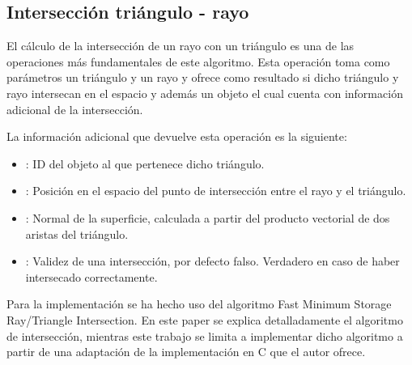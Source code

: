 \subsection{Intersección triángulo - rayo}
\label{subsec:triintersection}
	
El cálculo de la intersección de un rayo con un triángulo es una de las operaciones más fundamentales de este algoritmo. Esta operación toma como parámetros un triángulo  y un rayo  y ofrece como resultado si dicho triángulo y rayo intersecan en el espacio y además un objeto  el cual cuenta con información adicional de la intersección.

La información adicional que devuelve esta operación es la siguiente:

\begin{itemize}
	
	\item {}: ID del objeto al que pertenece dicho triángulo.
	
	\item {}: Posición en el espacio del punto de intersección entre el rayo y el triángulo.
	
	\item {}: Normal de la superficie, calculada a partir del producto vectorial de dos aristas del triángulo.
	
	\item {}: Validez de una intersección, por defecto falso. Verdadero en caso de haber intersecado correctamente.

\end{itemize}

Para la implementación se ha hecho uso del algoritmo Fast Minimum Storage Ray/Triangle Intersection\cite{moller1997fast}. En este paper se explica detalladamente el algoritmo de intersección, mientras este trabajo se limita a implementar dicho algoritmo a partir de una adaptación de la implementación en C que el autor ofrece.
	
